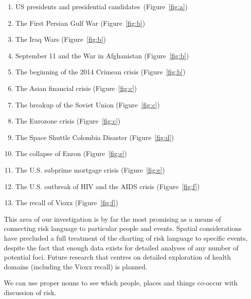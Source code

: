     \begin{enumerate} \setlength\itemsep{0em}
    \item US presidents and presidential candidates~(Figure~\ref{fig:a})
    \item The First Persian Gulf War (Figure~\ref{fig:b})                   
    \item The Iraq Wars (Figure~\ref{fig:b})
    \item September 11 and the War in Afghanistan (Figure~\ref{fig:b})   
    \item The beginning of the 2014 Crimean crisis (Figure~\ref{fig:b})       
    \item The Asian financial crisis (Figure~\ref{fig:c})
    \item The breakup of the Soviet Union (Figure~\ref{fig:c})
    \item The Eurozone crisis (Figure~\ref{fig:c})
    \item The Space Shuttle Colombia Disaster (Figure~\ref{fig:d})
    \item The collapse of Enron (Figure~\ref{fig:e})
    \item The U.S. subprime mortgage crisis  (Figure~\ref{fig:e})
    \item The U.S. outbreak of HIV and the AIDS crisis (Figure~\ref{fig:f})
    \item The recall of Vioxx (Figure~\ref{fig:f})
    \end{enumerate}
    This area of our investigation is by far the most promising as a means of connecting risk language to particular people and events. Spatial considerations have precluded a full treatment of the charting of risk language to specific events, despite the fact that enough data exists for detailed analyses of any number of potential foci. Future research that centres on detailed exploration of health domains (including the Vioxx recall) is planned.

    \vspace{5mm}\noindent\begin{tcolorbox}[colback=yellow!5,colframe=yellow!40!black,title=Summary: risk and proper nouns]
    \parbox{1\textwidth}{%
    We can use proper nouns to see which people, places and things co-occur with discussion of risk.}
    \end{tcolorbox}
    \vspace{5mm}

